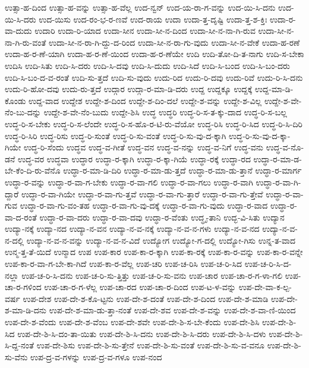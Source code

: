 {ಉತ್ಸಾ-ಹ-ದಿಂದ
ಉತ್ಸಾ-ಹ-ವನ್ನು
ಉತ್ಸಾ-ಹ-ವೆಲ್ಲ
ಉದ-ನ್ವನ್
ಉದ-ಯ-ರಾ-ಗ-ವನ್ನು
ಉದ-ಯಿ-ಸಿ-ದನು
ಉದ-ಯಿ-ಸಿ-ದರು
ಉದ-ಯಿಸು
ಉದ-ರಂ-ಭ-ರ-ಣವೆ
ಉದ-ರಾಯ
ಉದಾ
ಉದಾ-ತ್ತ-ದೃಷ್ಟಿ
ಉದಾ-ತ್ತ-ಶ-ಕ್ತಿಃ
ಉದಾ-ರ-ವಾ-ದುದು
ಉದಾರಿ
ಉದಾ-ರಿ-ಯಾದ
ಉದಾ-ಸೀನ
ಉದಾ-ಸೀ-ನ-ದಿಂದ
ಉದಾ-ಸೀ-ನ-ನಾ-ಗಿ-ರುವ
ಉದಾ-ಸೀ-ನ-ನಾ-ಗಿ-ರು-ವಂತೆ
ಉದಾ-ಸೀ-ನ-ರಾ-ಗಿ-ದ್ದು-ದ-ರಿಂದ
ಉದಾ-ಸೀ-ನ-ರಾ-ಗು-ವುದು
ಉದಾ-ಸೀ-ನ-ವೇಕೆ
ಉದಾ-ಹ-ರಣೆ
ಉದಾ-ಹ-ರ-ಣೆ-ಯಾಗಿ
ಉದಾ-ಹ-ರ-ಣೆ-ಯಿಂದ
ಉದಾ-ಹ-ರ-ಣೆಯೇ
ಉದಿ
ಉದಿ-ತೋ-ದಿ-ತ-ನಾಗು
ಉದಿ-ಸ-ಬೇಕಾ
ಉದಿಸಿ
ಉದಿ-ಸಿತು
ಉದಿ-ಸಿ-ದರು
ಉದಿ-ಸಿ-ದವು
ಉದಿ-ಸಿ-ದುದು
ಉದಿ-ಸಿದೆ
ಉದಿ-ಸಿ-ಬಂದ
ಉದಿ-ಸಿ-ಬಂ-ದರು
ಉದಿ-ಸಿ-ಬಂ-ದ-ವ-ರಂತೆ
ಉದಿ-ಸು-ತ್ತದೆ
ಉದಿ-ಸು-ವುದು
ಉದು-ರಿದ
ಉದು-ರಿ-ದವು
ಉದು-ರಿವೆ
ಉದು-ರಿ-ಸಿ-ದನು
ಉದು-ರಿ-ಹೋ-ದವು
ಉದು-ರು-ತ್ತದೆ
ಉದ್ಗಾರ
ಉದ್ಗಾ-ರ-ಮಾ-ಡಿ-ದರು
ಉದ್ದ
ಉದ್ದಕ್ಕೂ
ಉದ್ದಕ್ಕೆ
ಉದ್ದ-ಮಾ-ಡಿ-ಕೊಂಡು
ಉದ್ದ-ವಾದ
ಉದ್ದೇಶ
ಉದ್ದೇ-ಶ-ದಿಂದ
ಉದ್ದೇ-ಶ-ದಿಂ-ದಲೆ
ಉದ್ದೇ-ಶ-ವನ್ನು
ಉದ್ದೇ-ಶ-ವಿಲ್ಲ
ಉದ್ದೇ-ಶ-ವೇ-ನೆಂ-ಬು-ದನ್ನು
ಉದ್ದೇ-ಶ-ವೇ-ನೆಂ-ಬುದು
ಉದ್ದೇ-ಶಿಸಿ
ಉದ್ಧ
ಉದ್ಧರಿ
ಉದ್ಧ-ರಿ-ಸ-ತ-ಕ್ಕು-ದಾದ
ಉದ್ಧ-ರಿ-ಸ-ಬಲ್ಲ
ಉದ್ಧ-ರಿ-ಸ-ಬೇಕು
ಉದ್ಧ-ರಿ-ಸ-ಲೆಂದೇ
ಉದ್ಧ-ರಿ-ಸ-ಹೊ-ರ-ಟಿ-ರು-ವೆಯೋ
ಉದ್ಧ-ರಿಸಿ
ಉದ್ಧ-ರಿ-ಸಿದ
ಉದ್ಧ-ರಿ-ಸಿ-ದಿರಿ
ಉದ್ಧ-ರಿ-ಸಿರಿ
ಉದ್ಧ-ರಿಸು
ಉದ್ಧ-ರಿ-ಸುಂತೆ
ಉದ್ಧ-ರಿ-ಸು-ವಂತೆ
ಉದ್ಧ-ರಿ-ಸು-ವು-ದ-ಕ್ಕಾಗಿ
ಉದ್ಧ-ರಿ-ಸು-ವು-ದ-ಕ್ಕಾ-ಗಿಯೇ
ಉದ್ಧ-ರಿ-ಸೆಂದು
ಉದ್ಧವ
ಉದ್ಧ-ವ-ಗೀತೆ
ಉದ್ಧ-ವನ
ಉದ್ಧ-ವ-ನನ್ನು
ಉದ್ಧ-ವ-ನಿಗೆ
ಉದ್ಧ-ವನು
ಉದ್ಧ-ವ-ನೊ-ಡನೆ
ಉದ್ಧ-ವರ
ಉದ್ಧವಾ
ಉದ್ಧಾರ
ಉದ್ಧಾ-ರ-ಕ್ಕಾಗಿ
ಉದ್ಧಾ-ರ-ಕ್ಕಾ-ಗಿಯೆ
ಉದ್ಧಾ-ರಕ್ಕೆ
ಉದ್ಧಾ-ರದ
ಉದ್ಧಾ-ರ-ಮಾ-ಡ-ಬೇ-ಕೆಂ-ದಿ-ರು-ವೆನೊ
ಉದ್ಧಾ-ರ-ಮಾ-ಡಿ-ದಿರಿ
ಉದ್ಧಾ-ರ-ಮಾ-ಡು-ತ್ತದೆ
ಉದ್ಧಾ-ರ-ಮಾ-ಡು-ತ್ತಾನೆ
ಉದ್ಧಾ-ರ-ಮಾರ್ಗ
ಉದ್ಧಾ-ರ-ವನ್ನು
ಉದ್ಧಾ-ರ-ವಾ-ಗ-ಬೇಕು
ಉದ್ಧಾ-ರ-ವಾ-ಗಲಿ
ಉದ್ಧಾ-ರ-ವಾ-ಗಲು
ಉದ್ಧಾ-ರ-ವಾಗಿ
ಉದ್ಧಾ-ರ-ವಾ-ಗಿ-ದ್ದಾರೆ
ಉದ್ಧಾ-ರ-ವಾ-ಗಿಯೇ
ಉದ್ಧಾ-ರ-ವಾ-ಗು-ತ್ತವೆ
ಉದ್ಧಾ-ರ-ವಾ-ಗು-ತ್ತಾರೆ
ಉದ್ಧಾ-ರ-ವಾ-ಗು-ತ್ತೇವೆ
ಉದ್ಧಾ-ರ-ವಾ-ಗುವ
ಉದ್ಧಾ-ರ-ವಾ-ಗು-ವಂ-ತಹ
ಉದ್ಧಾ-ರ-ವಾ-ಗು-ವು-ದಕ್ಕೆ
ಉದ್ಧಾ-ರ-ವಾ-ಗು-ವುದು
ಉದ್ಧಾ-ರ-ವಾದ
ಉದ್ಧಾ-ರ-ವಾ-ದ-ರಂತೆ
ಉದ್ಧಾ-ರ-ವಾ-ದರು
ಉದ್ಧಾ-ರ-ವಾ-ದವು
ಉದ್ಧಾ-ರ-ವೆಂತು
ಉದ್ಧೃ-ತಾನಿ
ಉದ್ಭ-ವಿ-ಸಿತು
ಉದ್ಯಾನ
ಉದ್ಯಾ-ನಕ್ಕೆ
ಉದ್ಯಾ-ನದ
ಉದ್ಯಾ-ನ-ವನ
ಉದ್ಯಾ-ನ-ವ-ನಕ್ಕೆ
ಉದ್ಯಾ-ನ-ವ-ನ-ಗಳು
ಉದ್ಯಾ-ನ-ವ-ನದ
ಉದ್ಯಾ-ನ-ವ-ನ-ದಲ್ಲಿ
ಉದ್ಯಾ-ನ-ವ-ನ-ವನ್ನು
ಉದ್ಯಾ-ನ-ವ-ನ-ವಿದೆ
ಉದ್ಯೋಗ
ಉದ್ಯೋ-ಗ-ದಲ್ಲಿ
ಉದ್ಯೋ-ಗಿಸು
ಉನ್ನ-ತ-ವಾದ
ಉನ್ಮ-ತ್ತ-ತೆ-ಯಿದೆ
ಉನ್ಮಾದ
ಉಪ
ಉಪ-ಕಾರ
ಉಪ-ಕಾ-ರ-ಕ್ಕಾಗಿ
ಉಪ-ಕಾ-ರಕ್ಕೆ
ಉಪ-ಕಾ-ರ-ವನ್ನು
ಉಪ-ಕಾ-ರ-ವನ್ನೇ
ಉಪ-ಕಾ-ರ-ವಾ-ಗ-ಬೇ-ಕಾ-ಗಿದೆ
ಉಪ-ಕಾ-ರ-ವೆಲ್ಲ
ಉಪ-ಚರಿ
ಉಪ-ಚ-ರಿಸಿ
ಉಪ-ಚ-ರಿ-ಸಿದ
ಉಪ-ಚ-ರಿ-ಸಿ-ದ-ನಲ್ಲಾ
ಉಪ-ಚ-ರಿ-ಸಿ-ದನು
ಉಪ-ಚ-ರಿ-ಸು-ತ್ತಿತ್ತು
ಉಪ-ಚ-ರಿ-ಸು-ವನು
ಉಪ-ಚಾರ
ಉಪ-ಚಾ-ರ-ಗ-ಳಾ-ಗಲಿ
ಉಪ-ಚಾ-ರ-ಗಳಿಂದ
ಉಪ-ಚಾ-ರ-ಗ-ಳೆಲ್ಲ
ಉಪ-ಚಾ-ರದ
ಉಪ-ಚಾ-ರ-ದಿಂದ
ಉಪ-ಟ-ಳ-ವನ್ನು
ಉಪ-ದೇ-ವಾ-ಕ-ಲ್ಪ-ವರ್ಷ
ಉಪ-ದೇಶ
ಉಪ-ದೇ-ಶ-ಕೊ-ಟ್ಟನು
ಉಪ-ದೇ-ಶ-ದಂತೆ
ಉಪ-ದೇ-ಶ-ದಿಂದ
ಉಪ-ದೇ-ಶ-ಮಾಡಿ
ಉಪ-ದೇ-ಶ-ಮಾ-ಡಿ-ದನು
ಉಪ-ದೇ-ಶ-ಮಾ-ಡು-ತ್ತಾ-ನಂತೆ
ಉಪ-ದೇ-ಶವ
ಉಪ-ದೇ-ಶ-ವನ್ನು
ಉಪ-ದೇ-ಶ-ವಾ-ಣಿ-ಯಿಂದ
ಉಪ-ದೇ-ಶ-ವೆಂದು
ಉಪ-ದೇ-ಶ-ವೆಂಬ
ಉಪ-ದೇ-ಶವೇ
ಉಪ-ದೇ-ಶಿ-ಸ-ಬೇ-ಕೆಂದು
ಉಪ-ದೇ-ಶಿಸಿ
ಉಪ-ದೇ-ಶಿ-ಸಿದ
ಉಪ-ದೇ-ಶಿ-ಸಿ-ದಂ-ತಾ-ಯಿತು
ಉಪ-ದೇ-ಶಿ-ಸಿ-ದನು
ಉಪ-ದೇ-ಶಿ-ಸಿ-ದರು
ಉಪ-ದೇ-ಶಿ-ಸಿ-ದಳು
ಉಪ-ದೇ-ಶಿ-ಸಿ-ದ್ದ-ನಂತೆ
ಉಪ-ದೇ-ಶಿಸು
ಉಪ-ದೇ-ಶಿ-ಸು-ತ್ತೇನೆ
ಉಪ-ದೇ-ಶಿ-ಸು-ವಂತೆ
ಉಪ-ದೇ-ಶಿ-ಸು-ವ-ವನೂ
ಉಪ-ದೇ-ಶಿ-ಸು-ವೆನು
ಉಪ-ದ್ರ-ವ-ಗಳನ್ನು
ಉಪ-ದ್ರ-ವ-ಗಳೂ
ಉಪ-ನಂದ
}
